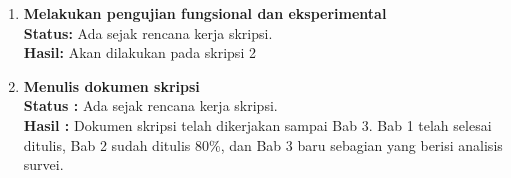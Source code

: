 \documentclass[a4paper,twoside]{article}
\begin{document}
\begin{enumerate}
\begin{itemize}
		\item Notifikasi email untuk mahasiswa jika permintaan sudah diselesaikan. Setelah dilihat fitur ini telah ada pada \textit{bluetape}.
		
		\item Halaman histori dan request transkrip terpisah. Masukan ini belum dikerjakan dan akan diselesaikan sebelum memasuki semester berikutnya.
		
		\item Pagination tidak terstyle dengan baik. Pagination telah diperbaiki dan dapat di klik. Lihat gambar \ref{fig:pagination}.
		\begin{figure}[H]
			\centering
			\texttt{[image: pagination]} 
			\caption{Pagination pada halaman manajemen perubahan kuliah}
			\label{fig:pagination} 
		\end{figure}
	
		\item Format \textit{Datetimepicker} tidak konsisten. Dari hari\&jam memiliki format YYYY/MM/DD. Hasil yang telah diperbaiki dapat dilihat pada gambar \ref{fig:datetimepicker}
		\begin{figure}[H]
			\centering
			\texttt{[image: datetimepicker]} 
			\caption{Format \textit{datetimepicker} yang telah diperbaiki}
			\label{fig:datetimepicker} 
		\end{figure}
		
	\end{itemize}
	
	
	\item \textbf{Melakukan pengujian fungsional dan eksperimental} \\
	\textbf{Status:} Ada sejak rencana kerja skripsi. \\
	\textbf{Hasil:}	Akan dilakukan pada skripsi 2
		
	\item \textbf{Menulis dokumen skripsi}\\
	{\bf Status :} Ada sejak rencana kerja skripsi.\\
	{\bf Hasil :} Dokumen skripsi telah dikerjakan sampai Bab 3. Bab 1 telah selesai ditulis, Bab 2 sudah ditulis 80\%, dan Bab 3 baru sebagian yang berisi analisis survei.

\end{enumerate}
\end{document}
